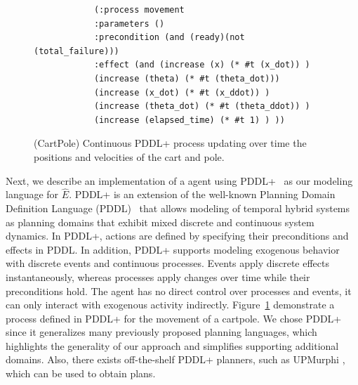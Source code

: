 \documentclass{article}
\begin{document}
\begin{figure}
	\begin{center}
		\fontsize{8pt}{10pt}\selectfont
		\begin{verbatim}
			(:process movement
			:parameters ()
			:precondition (and (ready)(not (total_failure)))
			:effect (and (increase (x) (* #t (x_dot)) )
			(increase (theta) (* #t (theta_dot)))
			(increase (x_dot) (* #t (x_ddot)) )
			(increase (theta_dot) (* #t (theta_ddot)) )
			(increase (elapsed_time) (* #t 1) ) ))
		\end{verbatim}
		\caption{(CartPole) Continuous PDDL+ process updating over time the positions and velocities of the cart and pole.}
		\label{fig:process-cartpole}
	\end{center}
\end{figure}


Next, we describe an implementation of a \hydra agent using PDDL+~\cite{fox2006modelling} as our modeling language for $\hat{E}$. 
PDDL+ is an extension of the well-known Planning Domain Definition Language (PDDL)~\cite{mcdermott1998pddl} that allows modeling of temporal hybrid systems as planning domains that exhibit mixed discrete and continuous system dynamics.
In PDDL+, actions are defined by specifying their preconditions and effects in PDDL. 
In addition, PDDL+ supports modeling exogenous behavior with discrete events and continuous processes.
Events apply discrete effects instantaneously, whereas processes apply changes over time while their preconditions hold. The agent has no direct control over processes and events, it can only interact with exogenous activity indirectly. 
Figure~\ref{fig:process-cartpole} demonstrate a process defined in PDDL+ for the movement of a cartpole. 
We chose PDDL+ since it generalizes many previously proposed planning languages, which highlights the generality of our approach and simplifies supporting additional domains. 
Also, there exists off-the-shelf PDDL+ planners, such as UPMurphi \cite{della2009upmurphi}, which can be used to obtain plans. 

 

\end{document}
